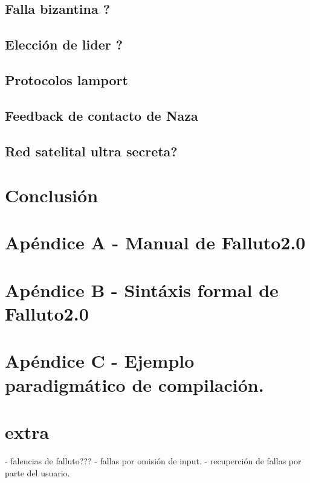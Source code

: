 \documentclass[titlepage, 12pt]{book}
\begin{document}
			\section{Falla bizantina ?}
			\section{Elecci\'on de lider ?}
			\section{Protocolos lamport}
			\section{Feedback de contacto de Naza}
			\section{Red satelital ultra secreta?}


\chapter{Conclusi\'on}

\chapter{Ap\'endice A - Manual de Falluto2.0}

\chapter{Ap\'endice B - Sint\'axis formal de Falluto2.0}

\chapter{Ap\'endice C - Ejemplo paradigm\'atico de compilaci\'on.}




\chapter{extra}
	- falencias de falluto??? 
	- fallas por omisi\'on de input.
	- recuperci\'on de fallas por parte del usuario.
\end{document}
